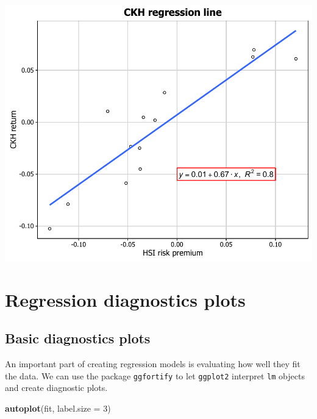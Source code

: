 \documentclass[]{article}
\newenvironment{Shaded}{\begin{snugshade}}{\end{snugshade}}
\newcommand{\KeywordTok}[1]{\textcolor[rgb]{0.13,0.29,0.53}{\textbf{{#1}}}}
\newcommand{\DataTypeTok}[1]{\textcolor[rgb]{0.13,0.29,0.53}{{#1}}}
\newcommand{\DecValTok}[1]{\textcolor[rgb]{0.00,0.00,0.81}{{#1}}}
\newcommand{\NormalTok}[1]{{#1}}
\begin{document}
\begin{center}\includegraphics{11_Linear_Regression_Plot_pdf/lr_18-1} \end{center}

\section{Regression diagnostics
plots}\label{regression-diagnostics-plots}

\subsection{Basic diagnostics plots}\label{basic-diagnostics-plots}

An important part of creating regression models is evaluating how well
they fit the data. We can use the package \texttt{ggfortify} to let
\texttt{ggplot2} interpret \texttt{lm} objects and create diagnostic
plots.

\begin{Shaded}
\begin{Highlighting}[]
\KeywordTok{autoplot}\NormalTok{(fit, }\DataTypeTok{label.size =} \DecValTok{3}\NormalTok{)}
\end{Highlighting}
\end{Shaded}
\end{document}
